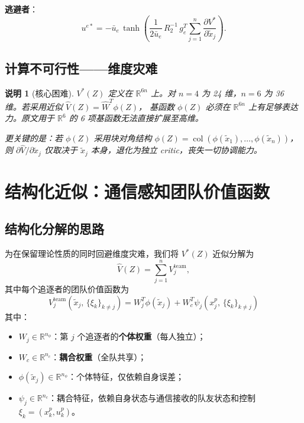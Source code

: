 \documentclass[12pt,a4paper]{ctexart}
\newtheorem{remark}[theorem]{说明}
\DeclareMathOperator{\col}{col}
\begin{document}
\textbf{逃避者}：
\begin{equation}\label{eq:group-ue}
u^{e*} = -\bar{u}_e\,\tanh\!\left(\frac{1}{2\bar{u}_e}\,R_2^{-1}\,g_e^T \sum_{j=1}^{n} \frac{\partial V^*}{\partial \tilde{x}_j}\right).
\end{equation}

\subsection{计算不可行性——维度灾难}

\begin{remark}[核心困难]\label{rmk:curse}
$V^*(Z)$ 定义在 $\mathbb{R}^{6n}$ 上。对 $n = 4$ 为 24 维，$n = 6$ 为 36 维。若采用近似
$\hat{V}(Z) = \hat{W}^T \phi(Z)$，
基函数 $\phi(Z)$ 必须在 $\mathbb{R}^{6n}$ 上有足够表达力。原文用于 $\mathbb{R}^6$ 的 6 项基函数无法直接扩展至高维。

更关键的是：若 $\phi(Z)$ 采用块对角结构 $\phi(Z) = \col(\phi(\tilde{x}_1), \dots, \phi(\tilde{x}_n))$，则 $\partial\hat{V}/\partial\tilde{x}_j$ 仅取决于 $\tilde{x}_j$ 本身，退化为独立 critic，丧失一切协调能力。
\end{remark}


\section{结构化近似：通信感知团队价值函数}

\subsection{结构化分解的思路}

为在保留理论性质的同时回避维度灾难，我们将 $V^*(Z)$ 近似分解为
\begin{equation}\label{eq:total-value}
\hat{V}(Z) = \sum_{j=1}^{n} V_j^{\mathrm{team}},
\end{equation}
其中每个追逐者的团队价值函数为
\begin{equation}\label{eq:team-value}
\boxed{
V_j^{\mathrm{team}}(\tilde{x}_j,\, \{\xi_k\}_{k \neq j})
= W_j^T \phi(\tilde{x}_j) + W_c^T \psi_j(x_j^p,\, \{\xi_k\}_{k \neq j})
}
\end{equation}
其中：
\begin{itemize}
\item $W_j \in \mathbb{R}^{n_\phi}$：第 $j$ 个追逐者的\textbf{个体权重}（每人独立）；
\item $W_c \in \mathbb{R}^{n_c}$：\textbf{耦合权重}（全队共享）；
\item $\phi(\tilde{x}_j) \in \mathbb{R}^{n_\phi}$：个体特征，仅依赖自身误差；
\item $\psi_j \in \mathbb{R}^{n_c}$：耦合特征，依赖自身状态与通信接收的队友状态和控制 $\xi_k = (x_k^p, u_k^p)$。
\end{itemize}
\end{document}
